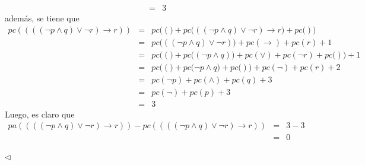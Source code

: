 \documentclass{article}
\begin{document}
\begin{itemize}
\begin{eqnarray*}
    &=& 3
  \end{eqnarray*}
  además, se tiene que
  \begin{eqnarray*}
    pc((((\neg p \land q) \lor \neg r) \rightarrow r)) &=&
    pc\big((\big) + pc\big(((\neg p \land q) \lor \neg r) \rightarrow r\big) + pc\big()\big)\\
    &=& pc\big(((\neg p \land q)\lor \neg r)\big) + pc(\rightarrow) + pc(r) + 1\\
    &=& pc\big((\big) + pc\big((\neg p \land q)\big) + pc(\lor) + pc(\neg r) + pc\big()\big) + 1\\
    &=& pc\big((\big) + pc\big(\neg p \land q\big) + pc\big()\big) + pc(\neg) + pc(r) + 2\\
    &=& pc(\neg p) + pc(\land) + pc(q) + 3\\
    &=& pc(\neg) + pc(p) + 3\\
    &=& 3
  \end{eqnarray*}
  Luego, es claro que
  \begin{eqnarray*}
    pa((((\neg p \land q) \lor \neg r) \rightarrow r)) - pc((((\neg p \land q) \lor \neg r) \rightarrow r))
    &=& 3 - 3\\
    &=& 0
  \end{eqnarray*}
\end{itemize}
\hfill $\lhd$
\end{document}
